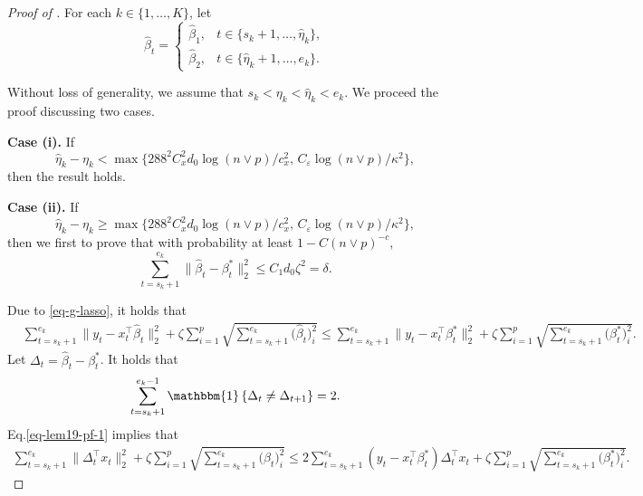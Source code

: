 \documentclass[twoside]{article}
\begin{document}
\begin{proof}[Proof of ]
For each $k \in \{1, \ldots, K\}$, let
	\[
		\widehat{\beta}_t = \begin{cases}
 				\widehat{\beta}_1, & t \in \{s_k + 1, \ldots, \widehat{\eta}_k\}, \\
 				\widehat{\beta}_2, & t \in \{\widehat{\eta}_k + 1, \ldots, e_k\}.
 			\end{cases}		
	\]
	
Without loss of generality, we assume that $s_k < \eta_k < \widehat{\eta}_k < e_k$.  We proceed the proof discussing two cases.

\vskip 3mm
\noindent \textbf{Case (i).}  If 
	\[
		\widehat{\eta}_k - \eta_k < \max\{288^2 C^2_x d_0 \log(n \vee p)/c_x^2, \, C_{\varepsilon}\log(n \vee p)/\kappa^2\},
	\]	
	then the result holds.

\vskip 3mm
\noindent \textbf{Case (ii).}  If 
	\begin{equation}\label{eq-pf-cor-6-int-con}
		\widehat{\eta}_k - \eta_k \geq \max\{288^2 C^2_x d_0 \log(n \vee p)/c_x^2, \, C_{\varepsilon}\log(n \vee p)/\kappa^2\},
	\end{equation} 
	then we first to prove that with probability at least $1 - C(n \vee p)^{-c}$,
	\[
		\sum_{t = s_k + 1}^{e_k}\|\widehat{\beta}_t - \beta^*_t\|_2^2 \leq C_1d_0 \zeta^2 = \delta.
	\]	

Due to \eqref{eq-g-lasso}, it holds that
	\begin{align}\label{eq-lem19-pf-1}
		& \sum_{t = s_k + 1}^{e_k} \|y_t - x_t^{\top}\widehat{\beta}_t\|_2^2 + \zeta \sum_{i = 1}^p \sqrt{\sum_{t = s_k + 1}^{e_k} \bigl(\widehat{\beta}_t\bigr)_i^2} \leq \sum_{t = s_k + 1}^{e_k} \|y_{t} - x_t^{\top}\beta^*_t \|_2^2 + \zeta \sum_{i = 1}^p \sqrt{\sum_{t = s_k + 1}^{e_k} \bigl(\beta^*_t\bigr)_{i}^2}.
	\end{align}
	Let $\Delta_t = \widehat{\beta}_t - \beta^*_t$.  It holds that
	\[
		\sum_{t = s_k + 1}^{e_k - 1}\mathbbm{1}\left\{\Delta_t \neq \Delta_{t+1}\right\} = 2.
	\]
	Eq.\eqref{eq-lem19-pf-1} implies that
	\begin{align}\label{eq-lem19-pf-2}
		\sum_{t = s_k + 1}^{e_k} \|\Delta_t^{\top} x_t\|_2^2 + \zeta  \sum_{i = 1}^p \sqrt{\sum_{t = s_k + 1}^{e_k} \bigl(\widehat{\beta}_t\bigr)_{i}^2}\leq 2\sum_{t = s_k + 1}^{e_k} (y_t - x_t^{\top}\beta^*_t)\Delta_t^{\top} x_t + \zeta \sum_{i = 1}^p \sqrt{\sum_{t = s_k + 1}^{e_k} \bigl(\beta^*_t\bigr)_{i}^2}.
	\end{align}


\end{proof}
\end{document}
